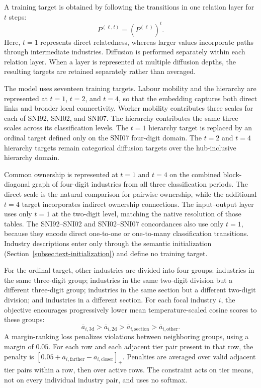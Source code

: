 \documentclass[9pt,twoside]{pnas-new}
\begin{document}
A training target is obtained by following the transitions in one relation
layer for $t$ steps:
\begin{equation}
P^{(\ell,t)}
=
\left(P^{(\ell)}\right)^t.
\label{eq:layer-diffusion}
\end{equation}
Here, $t=1$ represents direct relatedness, whereas larger values incorporate
paths through intermediate industries. Diffusion is performed separately
within each relation layer. When a layer is represented at multiple diffusion
depths, the resulting targets are retained separately rather than averaged.

The model uses seventeen training targets. Labour mobility
and the hierarchy are represented at $t=1$, $t=2$, and $t=4$, so that the
embedding captures both direct links and broader local connectivity. Worker
mobility contributes three scales for each of SNI92, SNI02, and SNI07. The
hierarchy contributes the same three scales across its classification levels.
The $t=1$ hierarchy target is replaced by an ordinal target defined only on
the SNI07 four-digit domain. The $t=2$ and $t=4$ hierarchy targets remain
categorical diffusion targets over the hub-inclusive hierarchy domain.

Common ownership is represented at $t=1$ and $t=4$ on the combined
block-diagonal graph of four-digit industries from all three classification
periods. The direct scale is the natural comparison for pairwise ownership,
while the additional $t=4$ target incorporates indirect ownership connections. The
input--output layer uses only $t=1$ at the two-digit level, matching the native
resolution of those tables. The SNI92--SNI02 and SNI02--SNI07 concordances also
use only $t=1$, because they encode direct one-to-one or one-to-many
classification transitions. Industry descriptions enter only through the semantic
initialization (Section~\ref{subsec:text-initialization}) and define no training target.

For the ordinal target, other industries are divided into four groups:
industries in the same three-digit group; industries in the same two-digit
division but a different three-digit group; industries in the same section but
a different two-digit division; and industries in a different section. For
each focal industry $i$, the objective encourages progressively lower
mean temperature-scaled cosine scores to these groups:
\begin{equation}
\overline{a}_{i,\mathrm{3d}}
>
\overline{a}_{i,\mathrm{2d}}
>
\overline{a}_{i,\mathrm{section}}
>
\overline{a}_{i,\mathrm{other}}.
\label{eq:hierarchy-order}
\end{equation}
A margin-ranking loss penalizes violations between neighboring groups, using a
margin of $0.05$.
For each row and each adjacent tier pair present in that row, the penalty is
$[0.05+\overline a_{i,\mathrm{farther}}-\overline a_{i,\mathrm{closer}}]_+$.
Penalties are averaged over valid adjacent tier pairs within a row, then over active rows.
The constraint acts on tier means, not on every individual industry pair, and uses no softmax.
\end{document}

